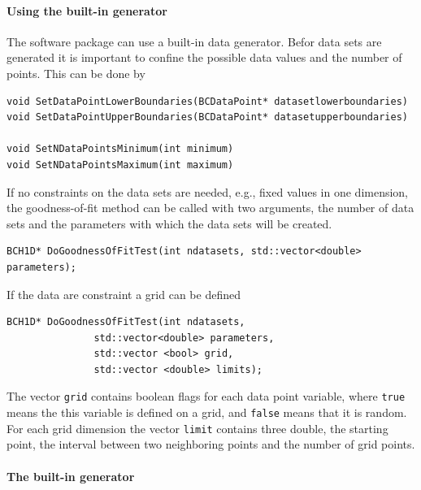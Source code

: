 \documentclass[11pt, a4paper]{article}
\begin{document}
\paragraph{Using the built-in generator} 

The software package can use a built-in data generator. Befor data
sets are generated it is important to confine the possible data
values and the number of points. This can be done by 

\begin{verbatim}
void SetDataPointLowerBoundaries(BCDataPoint* datasetlowerboundaries) 
void SetDataPointUpperBoundaries(BCDataPoint* datasetupperboundaries) 

void SetNDataPointsMinimum(int minimum) 
void SetNDataPointsMaximum(int maximum) 
\end{verbatim} 

If no constraints on the data sets are needed, e.g., fixed values in
one dimension, the goodness-of-fit method can be called with two
arguments, the number of data sets and the parameters with which the
data sets will be created.

\begin{verbatim} 
BCH1D* DoGoodnessOfFitTest(int ndatasets, std::vector<double> parameters); 
\end{verbatim} 

If the data are constraint a grid can be defined 

\begin{verbatim} 
BCH1D* DoGoodnessOfFitTest(int ndatasets, 
			   std::vector<double> parameters, 
			   std::vector <bool> grid, 
			   std::vector <double> limits); 
\end{verbatim} 

The vector \verb|grid| contains boolean flags for each data point
variable, where \verb|true| means the this variable is defined on a
grid, and \verb|false| means that it is random. For each grid
dimension the vector \verb|limit| contains three double, the starting
point, the interval between two neighboring points and the number of
grid points. \\ 

\paragraph{The built-in generator} 

\end{document}
